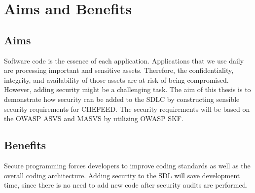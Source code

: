 
\section{Aims and Benefits}

\subsection{Aims}
Software code is the essence of each application. Applications that we use daily are processing important and sensitive assets. Therefore, the confidentiality, integrity, and availability of those assets are at risk of being compromised. However, adding security might be a challenging task. The aim of this thesis is to demonstrate how security can be added to the SDLC by constructing sensible security requirements for CHEFEED. The security requirements will be based on the OWASP ASVS and MASVS by utilizing OWASP SKF.

\subsection{Benefits}
Secure programming forces developers to improve coding standards as well as the overall coding architecture. Adding security to the SDL will save development time, since there is no need to add new code after security audits are performed.
